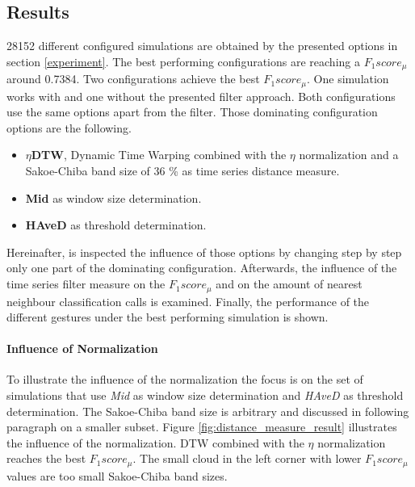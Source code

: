 \subsection{Results} \label{results}

28152 different configured simulations are obtained by the presented options in section \ref{experiment}. The best
performing configurations are reaching a $F_{1}score_{\mu}$ around 0.7384. Two configurations achieve the best
$F_{1}score_{\mu}$. One simulation works with and one without the presented filter approach. Both configurations use
the same options apart from the filter. Those dominating configuration options are the following.
\begin{itemize}
    \item \textbf{$\eta$DTW}, Dynamic Time Warping combined with the $\eta$ normalization and a Sakoe-Chiba band size of
        36 \% as time series distance measure.
    \item \textbf{Mid} as window size determination.
    \item \textbf{HAveD} as threshold determination.
\end{itemize}
Hereinafter, is inspected the influence of those options by changing step by step only one part of the
dominating configuration. Afterwards, the influence of the time series filter measure on the $F_{1}score_{\mu}$ and on
the amount of nearest neighbour classification calls is examined. Finally, the performance of the different gestures
under the best performing simulation is shown.

\paragraph{Influence of Normalization} To illustrate the influence of the normalization the focus is on the set of
simulations that use \textit{Mid} as window size determination and \textit{HAveD} as threshold determination. The
Sakoe-Chiba band size is arbitrary and discussed in following paragraph on a smaller subset. Figure
\ref{fig:distance_measure_result} illustrates the influence of the normalization. DTW combined with the $\eta$
normalization reaches the best $F_{1}score_{\mu}$. The small cloud in the left corner with lower $F_{1}score_{\mu}$
values are too small Sakoe-Chiba band sizes.


